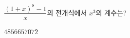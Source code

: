 $\dfrac{(1+x)^8-1}{x}$의 전개식에서 $x^3$의 계수는?
\begin{choices32}{$48$}{$56$}{$65$}{$70$}{$72$}\end{choices32}
